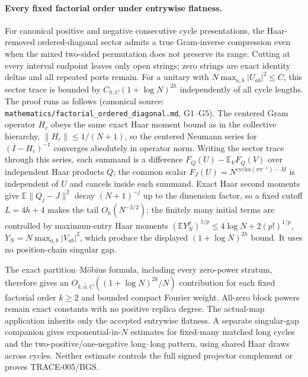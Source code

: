 \paragraph{Every fixed factorial order under entrywise flatness.}
For canonical positive and negative consecutive cycle presentations, the
Haar-removed ordered-diagonal sector admits a true Gram-inverse compression
even when the mixed two-sided permutation does not preserve its range.
Cutting at every interval endpoint leaves only open strings; zero strings
are exact identity deltas and all repeated ports remain.
For a unitary with $N\max_{a,b}|U_{ab}|^2\le C$, this sector trace is bounded
by $C_{h,C}(1+\log N)^{2h}$ independently of all cycle lengths.
The proof runs as follows (canonical source:
\texttt{mathematics/factorial\_ordered\_diagonal.md}, G1--G5).
The centered Gram operator $H_c$ obeys the same exact Haar moment bound
as in the collective hierarchy, $\|H_c\|\le1/(N+1)$, so the centered
Neumann series for $(I-H_c)^{-1}$ converges absolutely in operator norm.
Writing the sector trace through this series, each summand is a difference
$F_Q(U)-\mathbb E_VF_Q(V)$ over independent Haar products $Q$; the common
scalar $F_J(U)=N^{\mathrm{cycles}(\sigma\pi^{-1})-M}$ is independent of
$U$ and cancels inside each summand. Exact Haar second moments give
$\mathbb E\|Q_j-J\|^2$ decay $(N+1)^{-j}$ up to the dimension factor, so a
fixed cutoff $L=4h+4$ makes the tail $O_h(N^{-3/2})$; the finitely many
initial terms are controlled by maximum-entry Haar moments
$(\mathbb E Y_N^p)^{1/p}\le4\log N+2(p!)^{1/p}$, $Y_N=N\max_{a,b}|V_{ab}|^2$,
which produce the displayed $(1+\log N)^{2h}$ bound. It uses no
position-chain singular gap.

The exact partition--M\"obius formula, including every zero-power stratum,
therefore gives an $O_{k,\widehat\phi,C}((1+\log N)^{2k}/N)$ contribution
for each fixed factorial order $k\ge2$ and bounded compact Fourier weight.
All-zero block powers remain exact constants with no positive replica degree.
The actual-map application inherits only the accepted entrywise flatness.
A separate singular-gap companion gives exponential-in-$N$ estimates for
fixed-many matched long cycles and the two-positive/one-negative long--long
pattern, using shared Haar draws across cycles. Neither estimate controls
the full signed projector complement or proves TRACE-005/BGS.
